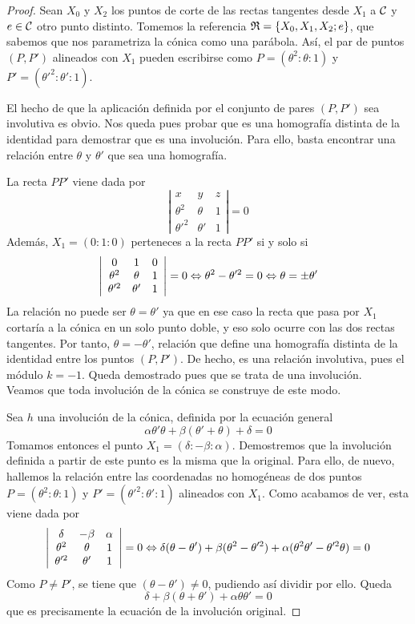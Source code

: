 \begin{proof}
	Sean $X_0$ y $X_2$ los puntos de corte de las rectas tangentes desde $X_1$ a $\mathcal{C}$ y $e\in\mathcal{C}$ otro punto distinto. Tomemos la referencia $\mathfrak{R}=\{X_0,X_1,X_2;e\}$, que sabemos que nos parametriza la cónica como una parábola. Así, el par de puntos $(P,P')$ alineados con $X_1$ pueden escribirse como $P=(\theta^2:\theta:1)$ y $P'=(\theta'^2:\theta':1)$.
	
	El hecho de que la aplicación definida por el conjunto de pares $(P,P')$ sea involutiva es obvio. Nos queda pues probar que es una homografía distinta de la identidad para demostrar que es una involución. Para ello, basta encontrar una relación  entre $\theta$ y $\theta'$ que sea una homografía.
	
	La recta $PP'$ viene dada por
	\[\left| \begin{array}{ccc}
		x&y&z\\
		\theta^2&\theta&1\\
		\theta'^2&\theta'&1
	\end{array}\right| =0\]
	Además, $X_1=(0:1:0)$ perteneces a la recta $PP'$ si y solo si
	\[\left| \begin{array}{ccc}
	0&1&0\\
	\theta^2&\theta&1\\
	\theta'^2&\theta'&1
	\end{array}\right| =0\Leftrightarrow \theta^2-\theta'^2=0\Leftrightarrow \theta=\pm\theta'\]
	La relación no puede ser $\theta=\theta'$ ya que en ese caso la recta que pasa por $X_1$ cortaría a la cónica en un solo punto doble, y eso solo ocurre con las dos rectas tangentes. Por tanto, $\theta=-\theta'$, relación que define una homografía distinta de la identidad entre los puntos $(P,P')$. De hecho, es una relación involutiva, pues el módulo $k=-1$. Queda demostrado pues que se trata de una involución.\\
	
	Veamos que toda involución de la cónica se construye de este modo.
	
	Sea $h$ una involución de la cónica, definida por la ecuación general
	\begin{equation*}
		\alpha\theta'\theta+\beta(\theta'+\theta)+\delta=0
	\end{equation*}
	Tomamos entonces el punto $X_1=(\delta:-\beta:\alpha)$. Demostremos que la involución definida a partir de este punto es la misma que la original. Para ello, de nuevo, hallemos la relación entre las coordenadas no homogéneas de dos puntos $P=(\theta^2:\theta:1)$ y $P'=(\theta'^2:\theta':1)$ alineados con $X_1$. Como acabamos de ver, esta viene dada por
	\[\left| \begin{array}{ccc}
	\delta&-\beta&\alpha\\
	\theta^2&\theta&1\\
	\theta'^2&\theta'&1
	\end{array}\right| =0\Leftrightarrow \delta(\theta-\theta')+\beta(\theta^2-\theta'^2)+\alpha(\theta^2\theta'-\theta'^2\theta)=0\]
	Como $P\not=P'$, se tiene que $(\theta-\theta')\not=0$, pudiendo así dividir por ello. Queda
	\[\delta +\beta(\theta+\theta')+\alpha\theta\theta'=0\]
	que es precisamente la ecuación de la involución original.
\end{proof}
